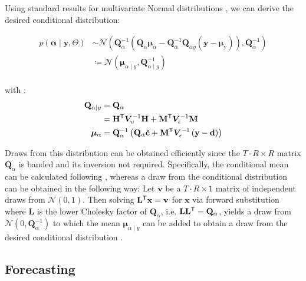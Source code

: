 \documentclass[notitlepage,a4paper,12pt]{article}
\newcommand{\transpose}[1]{{#1}^{\sf{T}}}
\begin{document}
Using standard results for multivariate Normal distributions \citep[e.g.][pp. 86-87]{bishop_prml_2006}, we can derive the desired conditional distribution:

\begin{align*}
    p
    \left(
        \boldsymbol{\alpha} \mid \mathbf{y}, \Theta
     \right) 
    &\sim
    \mathcal{N}
    \left(
    \mathbf{Q}^{-1}_{\alpha} \left( \mathbf{Q}_{\alpha}\boldsymbol{\mu}_{\alpha} - \mathbf{Q}^{-1}_{\alpha} \mathbf{Q}_{\alpha y} \left(\mathbf{y} - \boldsymbol{\mu}_{\text{y}}\right)\right), \mathbf{Q}_{\alpha}^{-1}
    \right) \\
    &\coloneqq \mathcal{N}
        \left(
            \boldsymbol{\mu}_{\alpha\mid y}, \mathbf{Q}_{\alpha\mid y}^{-1}
        \right) \\
\end{align*}

with \citep[see also][eqn. 6-8]{chanjeliazkov_2009}:
\begin{align*}
    \mathbf{Q}_{\alpha\mid y} &= \mathbf{Q}_{\alpha} \\
    &= 
    \transpose{\mathbf{H}} \bm{V}^{-1}_{\upsilon} \mathbf{H} + {\transpose{\mathbf{M}} \bm{V}^{-1}_{\epsilon}\mathbf{M}}\\
    \boldsymbol\mu_{\alpha} &= \mathbf{Q}_{\alpha}^{-1} \left(\mathbf{Q}_{\alpha} \tilde{\mathbf{c}}+ \transpose{\mathbf{M}} \bm{V}_{\epsilon}^{-1} \left(\mathbf{y} - \mathbf{d}\right) \right)
\end{align*}

Draws from this distribution can be obtained efficiently since the $T\cdot R \times R$ matrix $\mathbf{Q}_{\alpha}$ is banded and its inversion not required. Specifically, the conditional mean can be calculated following \citet[][Algorithm 2.1]{rueheld_2005}, whereas a draw from the conditional distribution can be obtained in the following way: Let $\mathbf{v}$ be a $T\cdot R \times 1$ matrix of independent draws from $\mathcal{N}(0,1)$. Then solving $\transpose{\mathbf{L}}\mathbf{x} = \mathbf{v}$ for $\mathbf{x}$ via forward substitution where $\mathbf{L}$ is the lower Cholesky factor of $\mathbf{Q}_{\alpha}$, i.e. $\mathbf{L}\transpose{\mathbf{L}} = \mathbf{Q}_{\alpha}$, yields a draw from $\mathcal{N}(0, \mathbf{Q}^{-1}_{\alpha})$ to which the mean $\mathbf{\mu}_{\alpha\mid y}$ can be added to obtain a draw from the desired conditional distribution \citep[][Algorithm 2.4]{rueheld_2005}.

\subsection{Forecasting}
\end{document}
